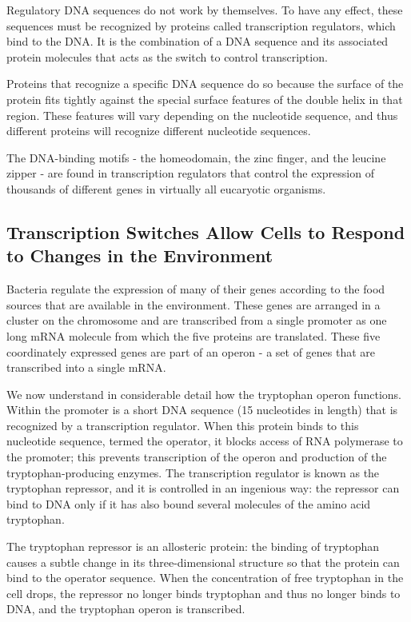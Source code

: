 Regulatory DNA sequences do not work by themselves. To have any
effect, these sequences must be recognized by proteins called transcription
regulators, which bind to the DNA. It is the combination of a DNA
sequence and its associated protein molecules that acts as the switch
to control transcription.

Proteins that recognize a specific DNA sequence do so because the surface
of the protein fits tightly against the special surface features of the
double helix in that region. These features will vary depending on the
nucleotide sequence, and thus different proteins will recognize different
nucleotide sequences.

The DNA-binding motifs - the homeodomain, the zinc finger, and the leucine zipper -
are found in transcription regulators that control the expression of thousands of different
genes in virtually all eucaryotic organisms.

\subsection{Transcription Switches Allow Cells to Respond to Changes in the Environment}

Bacteria regulate the expression of many of their genes according to the food sources
that are available in the environment. These
genes are arranged in a cluster on the chromosome and are transcribed
from a single promoter as one long mRNA molecule from which the five
proteins are translated. These five coordinately expressed genes are part of an
operon - a set of genes that are transcribed into a single mRNA.

We now understand in considerable detail how the tryptophan operon
functions. Within the promoter is a short DNA sequence (15 nucleotides
in length) that is recognized by a transcription regulator. When this protein
binds to this nucleotide sequence, termed the operator, it blocks
access of RNA polymerase to the promoter; this prevents transcription
of the operon and production of the tryptophan-producing enzymes. The
transcription regulator is known as the tryptophan repressor, and it is controlled
in an ingenious way: the repressor can bind to DNA only if it has
also bound several molecules of the amino acid tryptophan.

The tryptophan repressor is an allosteric protein: the
binding of tryptophan causes a subtle change in its three-dimensional
structure so that the protein can bind to the operator sequence. When
the concentration of free tryptophan in the cell drops, the repressor no
longer binds tryptophan and thus no longer binds to DNA, and the tryptophan
operon is transcribed.

